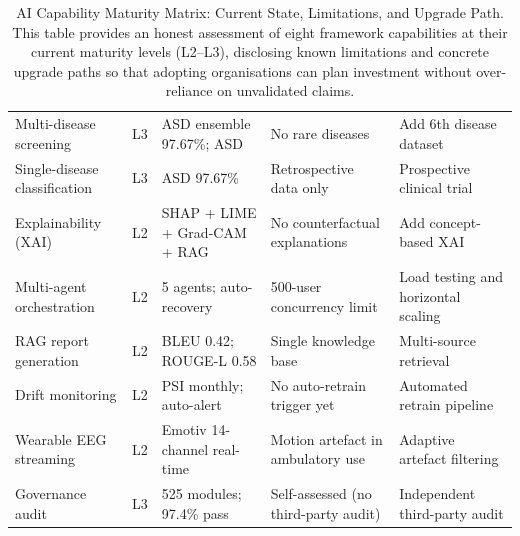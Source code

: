 \begin{table}[!htbp]
\tablestripes\tablefontsize
\tablefontsize
\caption[AI Capability Maturity Matrix: Current State,]{AI Capability Maturity Matrix: Current State, Limitations, and Upgrade Path. This table provides an honest assessment of eight framework capabilities at their current maturity levels (L2--L3), disclosing known limitations and concrete upgrade paths so that adopting organisations can plan investment without over-reliance on unvalidated claims.}
\begin{tabularx}{\textwidth}{@{} >{\raggedright\arraybackslash}p{1.6cm} p{0.7cm} L L L @{}}
\toprule
{} &  &  &  &  \\
\midrule
Multi-disease screening & L3 & ASD ensemble 97.67\%; ASD & No rare diseases & Add 6th disease dataset \\
\addlinespace
Single-disease classification & L3 & ASD 97.67\% & Retrospective data only & Prospective clinical trial \\
\addlinespace
Explainability (XAI) & L2 & SHAP + LIME + Grad-CAM + RAG & No counterfactual explanations & Add concept-based XAI \\
\addlinespace
Multi-agent orchestration & L2 & 5 agents; auto-recovery & 500-user concurrency limit & Load testing and horizontal scaling \\
\addlinespace
RAG report generation & L2 & BLEU 0.42; ROUGE-L 0.58 & Single knowledge base & Multi-source retrieval \\
\addlinespace
Drift monitoring & L2 & PSI monthly; auto-alert & No auto-retrain trigger yet & Automated retrain pipeline \\
\addlinespace
Wearable EEG streaming & L2 & Emotiv 14-channel real-time & Motion artefact in ambulatory use & Adaptive artefact filtering \\
\addlinespace
Governance audit & L3 & 525 modules; 97.4\% pass & Self-assessed (no third-party audit) & Independent third-party audit \\
\bottomrule
\end{tabularx}
\end{table}

